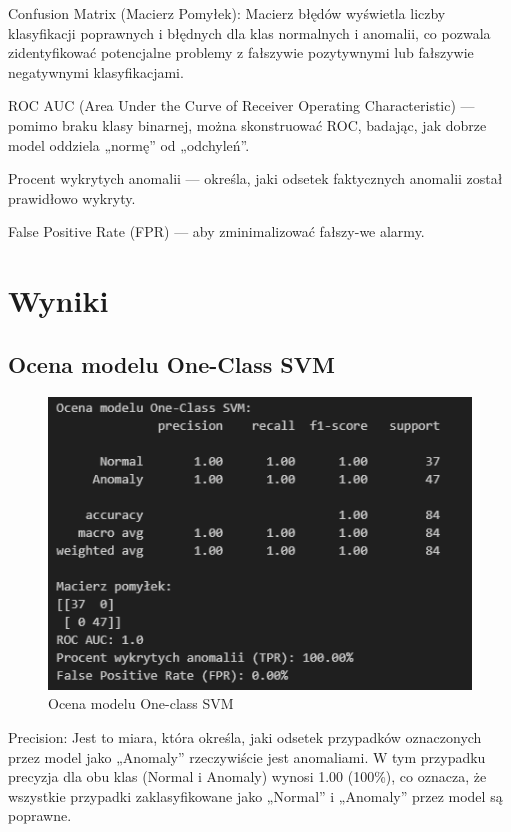 \documentclass[a4paper,fleqn]{cas-dc}
\begin{document}
Confusion Matrix (Macierz Pomyłek): Macierz błędów wyświetla liczby klasyfikacji poprawnych i błędnych dla klas normalnych i anomalii, co pozwala zidentyfikować potencjalne problemy z fałszywie pozytywnymi lub fałszywie negatywnymi klasyfikacjami.

ROC AUC (Area Under the Curve of Receiver Operating Characteristic) — pomimo braku klasy binarnej, można skonstruować ROC, badając, jak dobrze model oddziela „normę” od „odchyleń”.

Procent wykrytych anomalii — określa, jaki odsetek faktycznych anomalii został prawidłowo wykryty.

False Positive Rate (FPR) — aby zminimalizować fałszy-we alarmy.

\section{Wyniki}

\subsection{Ocena modelu One-Class SVM}

\begin{figure}[h]
	\includegraphics[scale=.70]{wykresy/ocena1.png}
	\caption{Ocena modelu One-class SVM}
	\label{FIG:1}
\end{figure}

Precision: Jest to miara, która określa, jaki odsetek przypadków oznaczonych przez model jako „Anomaly” rzeczywiście jest anomaliami. W tym przypadku precyzja dla obu klas (Normal i Anomaly) wynosi 1.00 (100\%), co oznacza, że wszystkie przypadki zaklasyfikowane jako „Normal” i „Anomaly” przez model są poprawne.
\end{document}
